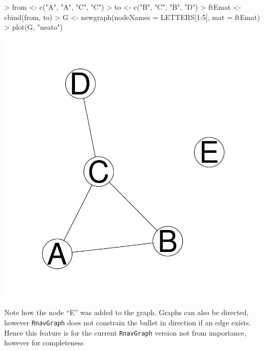 \documentclass[12pt,oneside,titlepage,letter]{article}
\begin{document}
\begin{center}
\begin{Schunk}
\begin{Sinput}
> from <- c("A", "A", "C", "C")
> to <- c("B", "C", "B", "D")
> ftEmat <- cbind(from, to)
> G <- newgraph(nodeNames = LETTERS[1:5], mat = ftEmat)
> plot(G, "neato")
\end{Sinput}
\end{Schunk}
\includegraphics{sweave_p-033}
\end{center}
Note how the node ``E'' was added to the graph. Graphs can also be directed, however \texttt{RnavGraph} does not constrain the bullet in direction if an edge exists. Hence this feature is for the current \texttt{RnavGraph} version not from importance, however for completeness 
\end{document}
